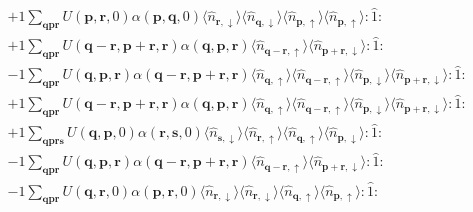 \begin{align*}
	&+1 \sum_{ \mathbf{q} \mathbf{p} \mathbf{r} } U( \mathbf{p}, \mathbf{r}, 0 )  \alpha( \mathbf{p}, \mathbf{q}, 0 )   \langle \hat{n}_{ \mathbf{r}, \downarrow } \rangle \langle \hat{n}_{ \mathbf{q}, \downarrow } \rangle \langle \hat{n}_{ \mathbf{p}, \uparrow } \rangle \langle \hat{n}_{ \mathbf{p}, \uparrow } \rangle : \hat{1} : \\
	&+1 \sum_{ \mathbf{q} \mathbf{p} \mathbf{r} } U( \mathbf{q}-\mathbf{r}, \mathbf{p}+\mathbf{r}, \mathbf{r} )  \alpha( \mathbf{q}, \mathbf{p}, \mathbf{r} )   \langle \hat{n}_{ \mathbf{q}-\mathbf{r}, \uparrow } \rangle \langle \hat{n}_{ \mathbf{p}+\mathbf{r}, \downarrow } \rangle : \hat{1} : \\
	&-1 \sum_{ \mathbf{q} \mathbf{p} \mathbf{r} } U( \mathbf{q}, \mathbf{p}, \mathbf{r} )  \alpha( \mathbf{q}-\mathbf{r}, \mathbf{p}+\mathbf{r}, \mathbf{r} )   \langle \hat{n}_{ \mathbf{q}, \uparrow } \rangle \langle \hat{n}_{ \mathbf{q}-\mathbf{r}, \uparrow } \rangle \langle \hat{n}_{ \mathbf{p}, \downarrow } \rangle \langle \hat{n}_{ \mathbf{p}+\mathbf{r}, \downarrow } \rangle : \hat{1} : \\
	&+1 \sum_{ \mathbf{q} \mathbf{p} \mathbf{r} } U( \mathbf{q}-\mathbf{r}, \mathbf{p}+\mathbf{r}, \mathbf{r} )  \alpha( \mathbf{q}, \mathbf{p}, \mathbf{r} )   \langle \hat{n}_{ \mathbf{q}, \uparrow } \rangle \langle \hat{n}_{ \mathbf{q}-\mathbf{r}, \uparrow } \rangle \langle \hat{n}_{ \mathbf{p}, \downarrow } \rangle \langle \hat{n}_{ \mathbf{p}+\mathbf{r}, \downarrow } \rangle : \hat{1} : \\
	&+1 \sum_{ \mathbf{q} \mathbf{p} \mathbf{r} \mathbf{s} } U( \mathbf{q}, \mathbf{p}, 0 )  \alpha( \mathbf{r}, \mathbf{s}, 0 )   \langle \hat{n}_{ \mathbf{s}, \downarrow } \rangle \langle \hat{n}_{ \mathbf{r}, \uparrow } \rangle \langle \hat{n}_{ \mathbf{q}, \uparrow } \rangle \langle \hat{n}_{ \mathbf{p}, \downarrow } \rangle : \hat{1} : \\
	&-1 \sum_{ \mathbf{q} \mathbf{p} \mathbf{r} } U( \mathbf{q}, \mathbf{p}, \mathbf{r} )  \alpha( \mathbf{q}-\mathbf{r}, \mathbf{p}+\mathbf{r}, \mathbf{r} )   \langle \hat{n}_{ \mathbf{q}-\mathbf{r}, \uparrow } \rangle \langle \hat{n}_{ \mathbf{p}+\mathbf{r}, \downarrow } \rangle : \hat{1} : \\
	&-1 \sum_{ \mathbf{q} \mathbf{p} \mathbf{r} } U( \mathbf{q}, \mathbf{r}, 0 )  \alpha( \mathbf{p}, \mathbf{r}, 0 )   \langle \hat{n}_{ \mathbf{r}, \downarrow } \rangle \langle \hat{n}_{ \mathbf{r}, \downarrow } \rangle \langle \hat{n}_{ \mathbf{q}, \uparrow } \rangle \langle \hat{n}_{ \mathbf{p}, \uparrow } \rangle : \hat{1} : \\

\end{align*}
